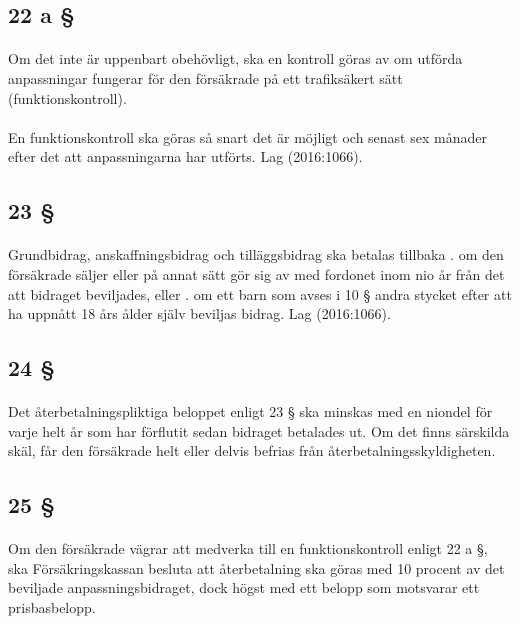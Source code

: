 \documentclass[a4paper,notitlepage,openany,10pt]{book}
\begin{document}
\subsection*{22 a §}
\paragraph*{}
Om det inte är uppenbart obehövligt, ska en kontroll göras av om utförda anpassningar fungerar för den försäkrade på ett trafiksäkert sätt (funktionskontroll).
\paragraph*{}
En funktionskontroll ska göras så snart det är möjligt och senast sex månader efter det att anpassningarna har utförts.
Lag (2016:1066).
\subsection*{23 §}
\paragraph*{}
Grundbidrag, anskaffningsbidrag och tilläggsbidrag ska betalas tillbaka
. om den försäkrade säljer eller på annat sätt gör sig av med fordonet inom nio år från det att bidraget beviljades, eller
. om ett barn som avses i 10 § andra stycket efter att ha uppnått 18 års ålder själv beviljas bidrag.
Lag (2016:1066).
\subsection*{24 §}
\paragraph*{}
Det återbetalningspliktiga beloppet enligt 23 § ska minskas med en niondel för varje helt år som har förflutit sedan bidraget betalades ut. Om det finns särskilda skäl, får den försäkrade helt eller delvis befrias från återbetalningsskyldigheten.
\subsection*{25 §}
\paragraph*{}
Om den försäkrade vägrar att medverka till en funktionskontroll enligt 22 a §, ska Försäkringskassan besluta att återbetalning ska göras med 10 procent av det beviljade anpassningsbidraget, dock högst med ett belopp som motsvarar ett prisbasbelopp.
\end{document}

